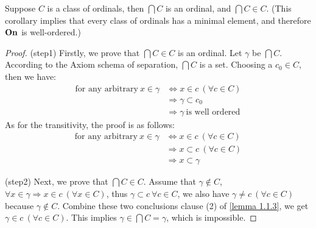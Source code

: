 \begin{corollary}
    \label{corollary 1.1.4}
    Suppose $C$ is a class of ordinals, then $\bigcap C$ is an ordinal, and $\bigcap C \in C$. %
    (This corollary implies that every class of ordinals has a minimal element, and therefore $\boldsymbol{\mathrm{On}}$ is well-ordered.)
\end{corollary}

\begin{proof}
  (step1) Firstly, we prove that $\bigcap C \in C$ is an ordinal. Let $\gamma$ be $\bigcap C$. According to the Axiom schema of separation, $\bigcap C$ is a set. Choosing a $c_0 \in C$, then we have:
  \begin{align*}
    \textrm{for any arbitrary}\ x \in \gamma &\Leftrightarrow x \in c  \ (\forall c \in C) \\
    & \Rightarrow \gamma \subset c_0  \\
    & \Rightarrow \gamma \ \textrm{is well ordered}
  \end{align*}
  As for the transitivity, the proof is as follows:
  \begin{align*}
    \textrm{for any arbitrary}\ x \in \gamma &\Leftrightarrow x \in c \ (\forall c \in C) \\
    & \Rightarrow x \subset c \ (\forall c \in C) \\
    & \Rightarrow x \subset \gamma
  \end{align*}
  
  

  (step2) Next, we prove that $\bigcap C \in C$. Assume that $\gamma \notin C$, $\forall x \in \gamma \Rightarrow x \in c \ (\forall x \in C)$, thus $\gamma \subset c \ \forall c \in C$, we also have $\gamma \neq c \ (\forall c \in C)$ because $\gamma \notin C$. Combine these two conclusions clause (2) of \ref{lemma 1.1.3}, we get $\gamma \in c \ (\forall c \in C)$. This implies $\gamma \in \bigcap C = \gamma$, which is impossible.
\end{proof}






